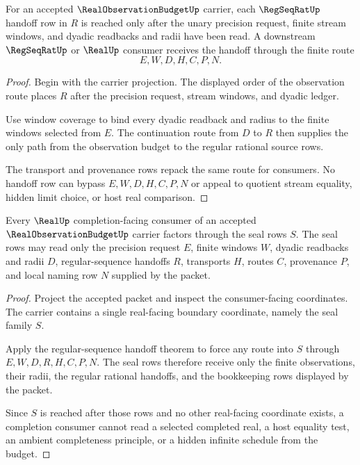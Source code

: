 \begin{theorem}
\label{thm:real-observation-budget-regseq-handoff}
For an accepted $\RealObservationBudgetUp$ carrier, each $\RegSeqRatUp$ handoff row in $R$ is reached only after the unary precision request, finite stream windows, and dyadic readbacks and radii have been read. A downstream $\RegSeqRatUp$ or $\RealUp$ consumer receives the handoff through the finite route
$$
E,W,D,H,C,P,N.
$$
\end{theorem}
\begin{proof}
Begin with the carrier projection. The displayed order of the observation route places $R$ after the precision request, stream windows, and dyadic ledger.

Use window coverage to bind every dyadic readback and radius to the finite windows selected from $E$. The continuation route from $D$ to $R$ then supplies the only path from the observation budget to the regular rational source rows.

The transport and provenance rows repack the same route for consumers. No handoff row can bypass $E,W,D,H,C,P,N$ or appeal to quotient stream equality, hidden limit choice, or host real comparison.
\end{proof}

\begin{theorem}
\label{thm:real-observation-budget-real-seal-boundary}
Every $\RealUp$ completion-facing consumer of an accepted $\RealObservationBudgetUp$ carrier factors through the seal rows $S$. The seal rows may read only the precision request $E$, finite windows $W$, dyadic readbacks and radii $D$, regular-sequence handoffs $R$, transports $H$, routes $C$, provenance $P$, and local naming row $N$ supplied by the packet.
\end{theorem}
\begin{proof}
Project the accepted packet and inspect the consumer-facing coordinates. The carrier contains a single real-facing boundary coordinate, namely the seal family $S$.

Apply the regular-sequence handoff theorem to force any route into $S$ through $E,W,D,R,H,C,P,N$. The seal rows therefore receive only the finite observations, their radii, the regular rational handoffs, and the bookkeeping rows displayed by the packet.

Since $S$ is reached after those rows and no other real-facing coordinate exists, a completion consumer cannot read a selected completed real, a host equality test, an ambient completeness principle, or a hidden infinite schedule from the budget.
\end{proof}

